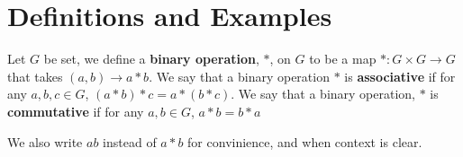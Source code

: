 \section{Definitions and Examples}
\label{section_1.1}

\begin{definition}
  Let $G$ be set, we define a  \textbf{binary operation}, $\ast$, on  $G$ to
  be a map  $\ast:G \times G \rightarrow G$ that takes $(a,b) \rightarrow a
  \ast b$. We say that a binary operation $\ast$ is \textbf{associative} if
  for any $a,b,c \in G$,  $(a \ast b) \ast c=a \ast (b \ast c)$. We say that a
  binary operation, $\ast$ is \textbf{commutative} if for any $a,b \in G$,
  $a \ast b=b \ast a$
\end{definition}
We also write $ab$ instead of  $a \ast b$ for convinience, and when
context is clear.

